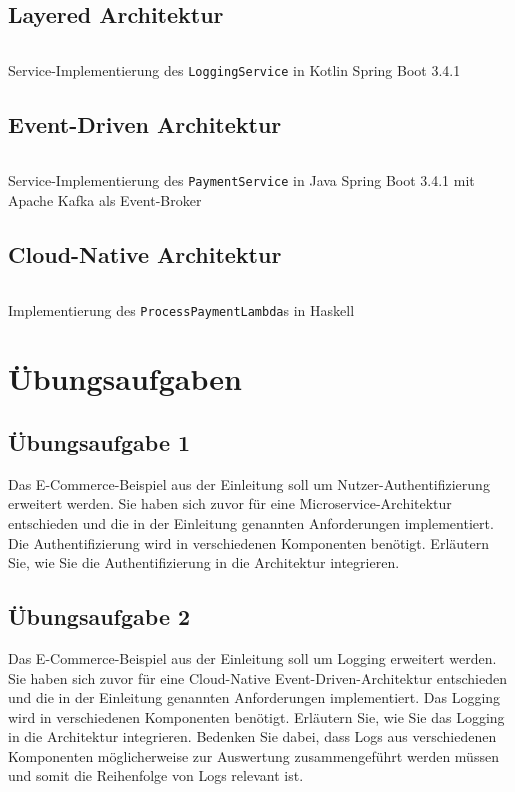 \documentclass[acmtog]{acmart}
\begin{document}
\subsection{Layered Architektur}
\label{app:code:layered:loggingservice}
\begin{listing}[H]
  \tiny
  \inputminted[linenos=true]{kotlin}{code/layered/LoggingServiceImpl.kt}
  \caption{Service-Implementierung des \texttt{LoggingService} in Kotlin Spring Boot 3.4.1}
\end{listing}

\subsection{Event-Driven Architektur}
\label{app:code:eda:paymentservice}
\begin{listing}[H]
  \tiny
  \inputminted[linenos=true]{java}{code/eda/PaymentService.java}
  \caption{Service-Implementierung des \texttt{PaymentService} in Java Spring Boot 3.4.1 mit Apache Kafka als Event-Broker}
\end{listing}

\subsection{Cloud-Native Architektur}
\label{app:code:cloudnative:paymentservice}
\begin{listing}[H]
  \tiny
  \inputminted[linenos=true]{haskell}{code/cloud/PaymentService.hs}
  \caption{Implementierung des \texttt{ProcessPaymentLambda}s in Haskell}
\end{listing}

\section{Übungsaufgaben}
\subsection{Übungsaufgabe 1}
Das E-Commerce-Beispiel aus der Einleitung soll um Nutzer-Authentifizierung erweitert werden.
Sie haben sich zuvor für eine Microservice-Architektur entschieden und die in der Einleitung genannten Anforderungen implementiert.
Die Authentifizierung wird in verschiedenen Komponenten benötigt.
Erläutern Sie, wie Sie die Authentifizierung in die Architektur integrieren.

\subsection{Übungsaufgabe 2}
Das E-Commerce-Beispiel aus der Einleitung soll um Logging erweitert werden.
Sie haben sich zuvor für eine Cloud-Native Event-Driven-Architektur entschieden und die in der Einleitung genannten Anforderungen implementiert.
Das Logging wird in verschiedenen Komponenten benötigt.
Erläutern Sie, wie Sie das Logging in die Architektur integrieren.
Bedenken Sie dabei, dass Logs aus verschiedenen Komponenten möglicherweise zur Auswertung zusammengeführt werden müssen und somit die Reihenfolge von Logs relevant ist.
\end{document}
